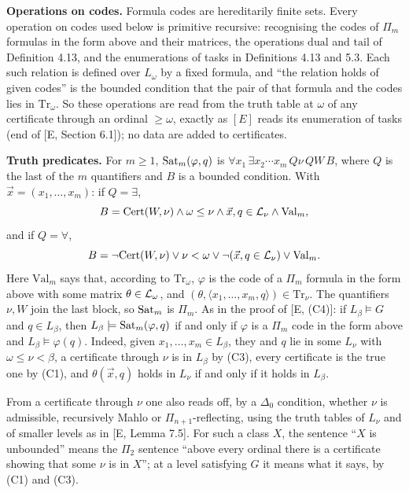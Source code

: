 \documentclass[11pt]{article}
\begin{document}
\textbf{Operations on codes.} Formula codes are hereditarily finite sets. Every operation on codes used below is
primitive recursive: recognising the codes of $\Pi_m$ formulas in the form above and their matrices, the operations
$\mathrm{dual}$ and $\mathrm{tail}$ of Definition 4.13, and the enumerations of tasks in Definitions 4.13 and 5.3. Each
such relation is defined over $L_\omega$ by a fixed formula, and ``the relation holds of given codes'' is the bounded
condition that the pair of that formula and the codes lies in $\mathrm{Tr}_\omega$. So these operations are read from
the truth table at $\omega$ of any certificate through an ordinal $\ge \omega$, exactly as $[E]$ reads its enumeration
of tasks (end of [E, Section 6.1]); no data are added to certificates.

\textbf{Truth predicates.} For $m \ge 1$, $\mathrm{Sat}_m(\varphi, q)$ is $\forall x_1\, \exists x_2 \cdots x_m\, Q\nu\,
QW\, B$, where $Q$ is the last of the $m$ quantifiers and $B$ is a bounded condition. With $\vec x = (x_1, \dots,
x_m)$: if $Q = \exists$,
\[ B = \mathrm{Cert}(W,\nu) \wedge \omega \le \nu \wedge \vec x, q \in \mathcal{L}_\nu \wedge \mathrm{Val}_m, \]
and if $Q = \forall$,
\[ B = \neg\mathrm{Cert}(W,\nu) \vee \nu < \omega \vee \neg(\vec x, q \in \mathcal{L}_\nu) \vee \mathrm{Val}_m. \]
Here
$\mathrm{Val}_m$ says that, according to $\mathrm{Tr}_\omega$, $\varphi$ is the code of a $\Pi_m$ formula in the form
above with some matrix $\theta \in \mathcal{L}_\omega$, and $(\theta, \langle x_1, \dots, x_m, q\rangle) \in \mathrm{Tr}_\nu$.
The quantifiers $\nu, W$ join the last block, so $\mathrm{Sat}_m$ is $\Pi_m$. As in the proof of [E, (C4)]: if $L_\beta \models
G$ and $q \in L_\beta$, then $L_\beta \models \mathrm{Sat}_m(\varphi, q)$ if and only if $\varphi$ is a $\Pi_m$ code in the
form above and $L_\beta \models \varphi(q)$. Indeed, given $x_1, \dots, x_m \in L_\beta$, they and $q$ lie in some
$L_\nu$ with $\omega \le \nu < \beta$, a certificate through $\nu$ is in $L_\beta$ by (C3), every certificate is the true
one by (C1), and $\theta(\vec x, q)$ holds in $L_\nu$ if and only if it holds in $L_\beta$.

From a certificate through $\nu$ one also reads off, by a $\Delta_0$ condition, whether $\nu$ is admissible,
recursively Mahlo or $\Pi_{n+1}$-reflecting, using the truth tables of $L_\nu$ and of smaller levels as in [E, Lemma
7.5]. For such a class $X$, the sentence ``$X$ is unbounded'' means the $\Pi_2$ sentence ``above every ordinal there is
a certificate showing that some $\nu$ is in $X$''; at a level satisfying $G$ it means what it says, by (C1) and (C3).
\end{document}
